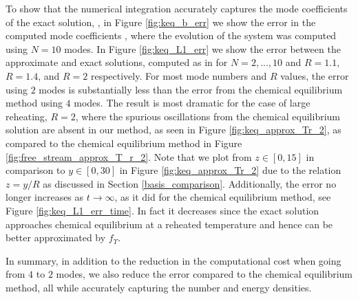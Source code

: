 To show that the numerical integration accurately captures the mode coefficients of the exact solution, , in Figure \ref{fig:keq_b_err} we show the error in the computed mode coefficients , where the evolution of the system was computed using $N=10$ modes. In Figure \ref{fig:keq_L1_err} we show the error between the approximate and exact solutions, computed as in  for $N=2,...,10$ and $R=1.1$, $R=1.4$, and $R=2$ respectively.  For most mode numbers and $R$ values, the error using $2$ modes is substantially less than the error from the chemical equilibrium method using $4$ modes.  The result is most dramatic for the case of large reheating, $R=2$, where the spurious oscillations from the chemical equilibrium solution are absent in our method, as seen in Figure \ref{fig:keq_approx_Tr_2}, as compared to the chemical equilibrium method in Figure \ref{fig:free_stream_approx_T_r_2}.  Note that we plot from $z\in [0,15]$ in comparison to $y\in[0,30]$ in Figure \ref{fig:keq_approx_Tr_2} due to the relation $z=y/R$ as discussed in Section \ref{basis_comparison}. Additionally, the error no longer increases as $t\rightarrow\infty$, as it did for the chemical equilibrium method, see Figure \ref{fig:keq_L1_err_time}.  In fact it decreases since the exact solution approaches chemical equilibrium at a reheated temperature and hence can be better approximated by $f_\Upsilon$. 

In summary, in addition to the reduction in the computational cost when going from $4$ to $2$ modes, we also reduce the error compared to the chemical equilibrium method, all while accurately capturing the number and energy densities. 

